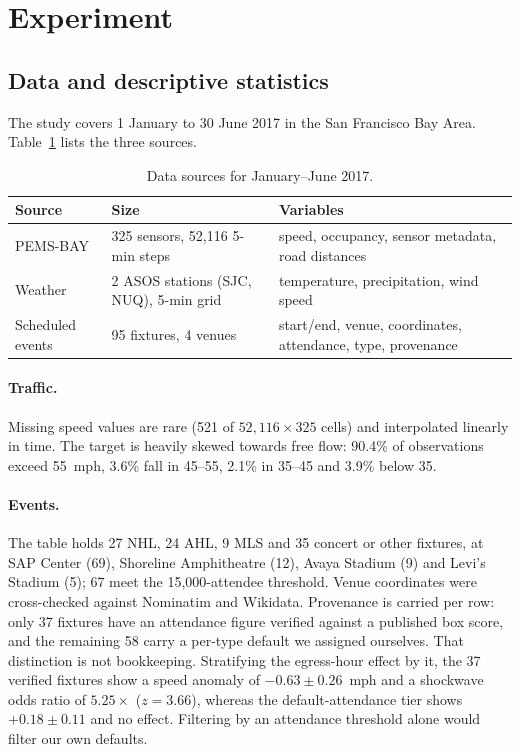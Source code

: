 \documentclass[letterpaper]{article}
\begin{document}
\section{Experiment}

\subsection{Data and descriptive statistics}

The study covers 1 January to 30 June 2017 in the San Francisco Bay Area. Table~\ref{tab:data} lists the three sources.

\begin{table}[t]
\centering
\small
\begin{tabular}{@{}p{}p{}p{}@{}}
\toprule
Source & Size & Variables \\
\midrule
PEMS-BAY \cite{li2018dcrnn,augmentedpemsbay} & 325 sensors, 52{,}116 5-min steps & speed, occupancy, sensor metadata, road distances \\
\addlinespace
Weather \cite{iem_asos} & 2 ASOS stations (SJC, NUQ), 5-min grid & temperature, precipitation, wind speed \\
\addlinespace
Scheduled events & 95 fixtures, 4 venues & start/end, venue, coordinates, attendance, type, provenance \\
\bottomrule
\end{tabular}
\caption{Data sources for January--June 2017.}
\label{tab:data}
\end{table}

\paragraph{Traffic.} Missing speed values are rare (521 of $52{,}116\times325$ cells) and interpolated linearly in time. The target is heavily skewed towards free flow: 90.4\% of observations exceed 55~mph, 3.6\% fall in 45--55, 2.1\% in 35--45 and 3.9\% below 35.

\paragraph{Events.} The table holds 27 NHL, 24 AHL, 9 MLS and 35 concert or other fixtures, at SAP Center (69), Shoreline Amphitheatre (12), Avaya Stadium (9) and Levi's Stadium (5); 67 meet the 15{,}000-attendee threshold. Venue coordinates were cross-checked against Nominatim and Wikidata. Provenance is carried per row: only 37 fixtures have an attendance figure verified against a published box score, and the remaining 58 carry a per-type default we assigned ourselves. That distinction is not bookkeeping. Stratifying the egress-hour effect by it, the 37 verified fixtures show a speed anomaly of $-0.63\pm0.26$~mph and a shockwave odds ratio of $5.25\times$ ($z=3.66$), whereas the default-attendance tier shows $+0.18\pm0.11$ and no effect. Filtering by an attendance threshold alone would filter our own defaults.
\end{document}
